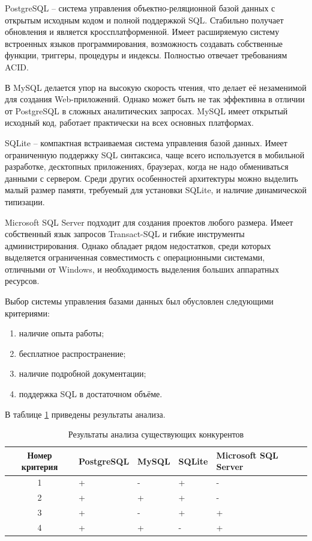 PostgreSQL -- система управления объектно-реляционной базой данных с открытым исходным кодом и полной поддержкой SQL.
Стабильно получает обновления и является кроссплатформенной. Имеет расширяемую систему встроенных языков программирования,
возможность создавать собственные функции, триггеры, процедуры и индексы. Полностью отвечает требованиям ACID.

В MySQL делается упор на высокую скорость чтения, что делает её незаменимой для создания Web-приложений. 
Однако может быть не так эффективна в отличии от PostgreSQL в сложных аналитических запросах.
MySQL имеет открытый исходный код, работает практически на всех основных платформах. 

SQLite -- компактная встраиваемая система управления базой данных. Имеет ограниченную поддержку SQL синтаксиса,
чаще всего используется в мобильной разработке, десктопных приложениях, браузерах, когда не надо обмениваться данными
с сервером. Среди других особенностей архитектуры можно выделить малый размер памяти, требуемый для установки SQLite, 
и наличие динамической типизации.

Microsoft SQL Server подходит для создания проектов любого размера. Имеет собственный язык запросов 
Transact-SQL и гибкие инструменты администрирования. Однако обладает рядом недостатков, среди которых выделяется
ограниченная совместимость с операционными системами, отличными от Windows, и необходимость выделения больших 
аппаратных ресурсов.

Выбор системы управления базами данных был обусловлен следующими критериями:

\begin{enumerate}
    \item наличие опыта работы;
    \item бесплатное распространение;
    \item наличие подробной документации;
    \item поддержка SQL в достаточном объёме.
\end{enumerate}

В таблице \ref{tab:anal_db} приведены результаты анализа.

\begin{table}[H]
	\centering
	\caption{Результаты анализа существующих конкурентов}
	\begin{tabular}{|c|p{3cm}|p{3cm}|p{2cm}|p{3cm}|}
	\hline
	Номер критерия & PostgreSQL & MySQL & SQLite & 	Microsoft SQL Server \\
	\hline
	1 & + & - & + & - \\
	\hline
	2 & + & + & + & - \\
	\hline
	3 & + & - & + & + \\
	\hline
	4 & + & + & - & + \\
	\hline
	\end{tabular}
	\label{tab:anal_db}
\end{table}

